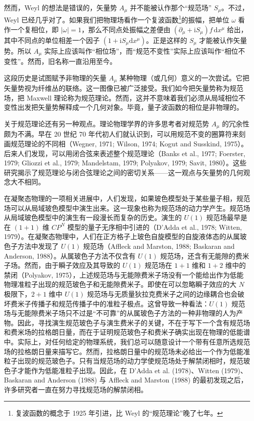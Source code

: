 然而，Weyl 的想法是错误的，矢量势 $A_\mu$ 并不能被认作那个“规范场” $S_\mu$。不过，Weyl 已经几乎对了。如果我们把物理场看作一个复波函数\footnote{复波函数的概念于 1925 年引进，比 Weyl 的“规范理论”晚了七年。}的振幅，把单位 $\omega$ 看作一个复相位，即 $|\omega|=1$，那么不同点处振幅之差便由 $(\partial_\mu+\mathrm{i}S_\mu)f\,\mathrm{d}x^{\mu}$ 给出，其中不同点的单位相差一个因子 $(1+\mathrm{i}S_\mu\mathrm{d}x^{\mu})$。正是这样的 $S_\mu$ 才能被认作矢量势。所以 $A_\mu$ 实际上应该叫作“相位场”，而“规范不变性”实际上应该叫作“相位不变性”。然而，旧名称一直沿用至今。

这段历史是试图赋予非物理的矢量 $A_\mu$ 某种物理（或几何）意义的一次尝试。它把矢量势视为纤维丛的联络。这一图像已被广泛接受。我们如今把矢量势称为规范场，把 Maxwell 理论称为规范理论。然而，这并不意味着我们必须从局域相位不变性出发把矢量势解释成一个几何对象。毕竟，量子波函数的相位是非物理的。

关于规范理论还有另一种观点。理论物理学界的许多思考者对规范势 $A_\mu$ 的冗余性颇为不满。早在 20 世纪 70 年代初人们就认识到，可以用规范不变的圈算符来刻画规范理论的不同相（Wegner, 1971; Wilson, 1974; Kogut and Susskind, 1975）。后来人们发现，可以用闭合弦来表述整个规范理论（Banks et al., 1977; Foerster, 1979; Gliozzi et al., 1979; Mandelstam, 1979; Polyakov, 1979; Savit, 1980）。这些研究揭示了规范理论与闭合弦理论之间的密切关系——这一观点与矢量势的几何观念大不相同。

在凝聚态物理的一项相关进展中，人们发现，如果玻色模型处于某些量子相，规范场可以从局域玻色模型中演生出来。这一现象也称为规范场的动力学产生。规范场从局域玻色模型中的演生有一段漫长而复杂的历史。演生的 $U(1)$ 规范场最早是在 $(1+1)$ 维 $CP^{N}$ 模型的量子无序相中引进的（D'Adda et al., 1978; Witten, 1979）。在凝聚态物理中，人们在正方格子上玻色自旋模型的自旋液体态的从属玻色子方法中发现了 $U(1)$ 规范场（Affleck and Marston, 1988; Baskaran and Anderson, 1988）。从属玻色子方法不仅含有 $U(1)$ 规范场，还含有无能隙的费米子场。然而，由于瞬子效应及其导致的 $U(1)$ 规范场在 $1+1$ 维和 $1+2$ 维中的禁闭（Polyakov, 1975），上述规范场与无能隙费米子场没有一个能给出作为低能物理准粒子出现的规范玻色子和无能隙费米子。即使在可以忽略瞬子效应的大 $N$ 极限下，$2+1$ 维中 $U(1)$ 规范场与无质量狄拉克费米子之间的边缘耦合也会破坏费米子传播子和规范传播子中的准粒子极点。这曾导致一种看法：$U(1)$ 规范场与无能隙费米子场只不过是“不可靠”的从属玻色子方法的一种非物理的人为产物。因此，寻找演生规范玻色子与演生费米子的关键，不在于写下一个含有规范场和费米场的拉格朗日量，而在于证明规范玻色子和费米子确实出现在物理的低能谱中。实际上，对任何给定的物理系统，我们总可以随意设计一个带有任意所选规范场的拉格朗日量来描写它。然而，拉格朗日量中的规范场未必给出一个作为低能准粒子出现的规范玻色子。只有当规范场的动力学使规范场处于解禁闭相时，规范玻色子才能作为低能准粒子出现。因此，在 D'Adda et al. (1978)、Witten (1979)、Baskaran and Anderson (1988) 与 Affleck and Marston (1988) 的最初发现之后，许多研究者一直在努力寻找规范场的解禁闭相。

